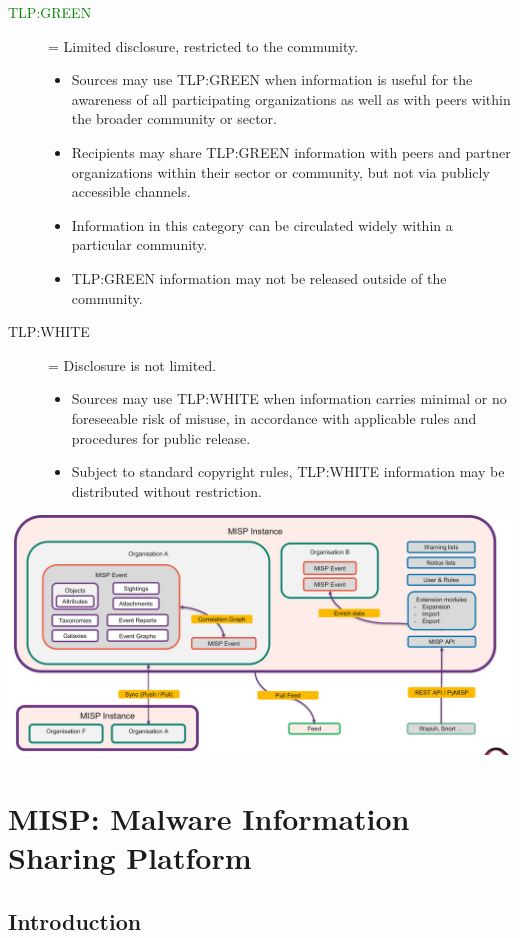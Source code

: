 \begin{description}
   \item[\textcolor{green}{TLP:GREEN}] = Limited disclosure, restricted to the community.
   \begin{itemize}
       \item Sources may use TLP:GREEN when information is useful for the awareness of all participating organizations as well as with peers within the broader community or sector.
       \item Recipients may share TLP:GREEN information with peers and partner organizations within their sector or community, but not via publicly accessible channels.
       \item Information in this category can be circulated widely within a particular community.
       \item TLP:GREEN information may not be released outside of the community.
   \end{itemize}

   \item[TLP:WHITE] = Disclosure is not limited.
   \begin{itemize}
       \item Sources may use TLP:WHITE when information carries minimal or no foreseeable risk of misuse, in accordance with applicable rules and procedures for public release.
       \item Subject to standard copyright rules, TLP:WHITE information may be distributed without restriction.
   \end{itemize}
\end{description}

\includegraphics[width=\textwidth]{resources/10-misp-overview.png}
\section{MISP: Malware Information Sharing Platform}

\subsection{Introduction}

